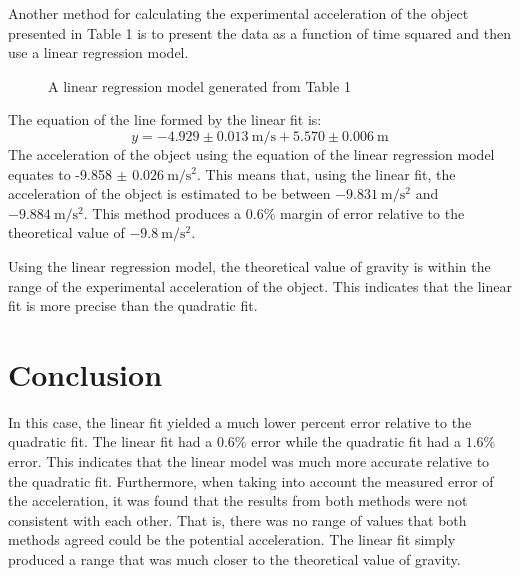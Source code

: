 \documentclass[12pt]{article}
\begin{document}
\bigskip

Another method for calculating the experimental acceleration of the object presented in Table 1 is to present the data as a function of time squared and then use a linear regression model.

\begin{figure}[H]
    \centering

    \caption[10pt]{A linear regression model generated from Table 1}


\end{figure}

The equation of the line formed by the linear fit is:
\[y= -4.929 \pm \SI{0.013}{\metre\per\second} + 5.570 \pm \SI{0.006}{\metre}\]
The acceleration of the object using the equation of the linear regression model equates to -9.858 $\pm$ $\SI{0.026}{\metre\per\second\squared}$. This means that, using the linear fit, the acceleration of the object is estimated to be between $\SI{-9.831}{\metre\per\second\squared}$ and $\SI{-9.884}{\metre\per\second\squared}$. This method produces a $0.6\%$ margin of error relative to the theoretical value of $\SI{-9.8}{\metre\per\second\squared}$.

Using the linear regression model, the theoretical value of gravity is within the range of the experimental acceleration of the object. This indicates that the linear fit is more precise than the quadratic fit.

\section{Conclusion}

In this case, the linear fit yielded a much lower percent error relative to the quadratic fit. The linear fit had a $0.6\%$ error while the quadratic fit had a $1.6\%$ error. This indicates that the linear model was much more accurate relative to the quadratic fit. Furthermore, when taking into account the measured error of the acceleration, it was found that the results from both methods were not consistent with each other. That is, there was no range of values that both methods agreed could be the potential acceleration. The linear fit simply produced a range that was much closer to the theoretical value of gravity.
\end{document}
